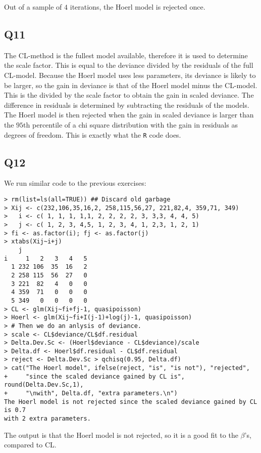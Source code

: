 \documentclass[11pt]{article}
\begin{document}
Out of a sample of $4$ iterations, the Hoerl model is rejected once.

\subsection*{Q11}
The CL-method is the fullest model available, therefore it is used to determine the scale factor. This is equal to the deviance divided by the residuals of the full CL-model. Because the Hoerl model uses less parameters, its deviance is likely to be larger, so the gain in deviance is that of the Hoerl model minus the CL-model. This is the divided by the scale factor to obtain the gain in scaled deviance. The difference in residuals is determined by subtracting the residuals of the models. The Hoerl model is then rejected when the gain in scaled deviance is larger than the $95$th percentile of a chi square distribution with the gain in residuals as degrees of freedom. This is exactly what the \verb|R| code does.

\subsection*{Q12}

We run similar code to the previous exercises:

\begin{verbatim}
> rm(list=ls(all=TRUE)) ## Discard old garbage
> Xij <- c(232,106,35,16,2, 258,115,56,27, 221,82,4, 359,71, 349)
>   i <- c( 1, 1, 1, 1,1, 2, 2, 2, 2, 3, 3,3, 4, 4, 5)
>   j <- c( 1, 2, 3, 4,5, 1, 2, 3, 4, 1, 2,3, 1, 2, 1)
> fi <- as.factor(i); fj <- as.factor(j)
> xtabs(Xij~i+j)
    j
i     1   2   3   4   5
  1 232 106  35  16   2
  2 258 115  56  27   0
  3 221  82   4   0   0
  4 359  71   0   0   0
  5 349   0   0   0   0
> CL <- glm(Xij~fi+fj-1, quasipoisson)
> Hoerl <- glm(Xij~fi+I(j-1)+log(j)-1, quasipoisson)
> # Then we do an anlysis of deviance.
> scale <- CL$deviance/CL$df.residual
> Delta.Dev.Sc <- (Hoerl$deviance - CL$deviance)/scale
> Delta.df <- Hoerl$df.residual - CL$df.residual
> reject <- Delta.Dev.Sc > qchisq(0.95, Delta.df)
> cat("The Hoerl model", ifelse(reject, "is", "is not"), "rejected",
+     "since the scaled deviance gained by CL is", round(Delta.Dev.Sc,1),
+     "\nwith", Delta.df, "extra parameters.\n")
The Hoerl model is not rejected since the scaled deviance gained by CL is 0.7 
with 2 extra parameters.
\end{verbatim}

The output is that the Hoerl model is not rejected, so it is a good fit to the $\beta$'s, compared to CL.
\end{document}
